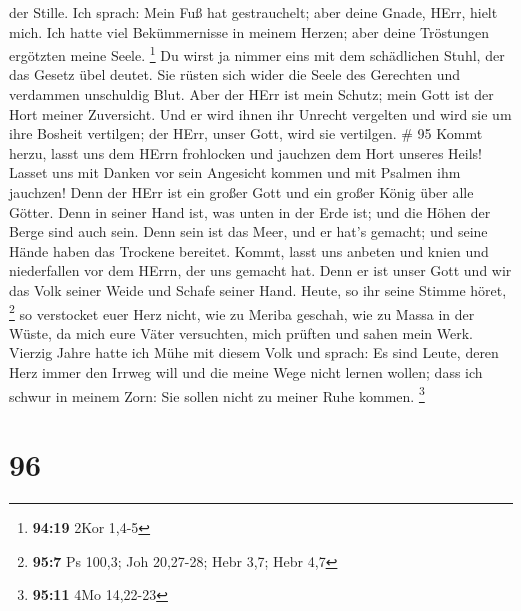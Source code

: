 der Stille.  Ich sprach: Mein Fuß hat gestrauchelt; aber
deine Gnade, HErr, hielt mich.  Ich hatte viel
Bekümmernisse in meinem Herzen; aber deine Tröstungen ergötzten meine
Seele. \footnote{\textbf{94:19} 2Kor 1,4-5}  Du wirst ja
nimmer eins mit dem schädlichen Stuhl, der das Gesetz übel deutet.
 Sie rüsten sich wider die Seele des Gerechten und
verdammen unschuldig Blut.  Aber der HErr ist mein Schutz;
mein Gott ist der Hort meiner Zuversicht.  Und er wird
ihnen ihr Unrecht vergelten und wird sie um ihre Bosheit vertilgen; der
HErr, unser Gott, wird sie vertilgen. \# 95  Kommt herzu,
lasst uns dem HErrn frohlocken und jauchzen dem Hort unseres Heils!
 Lasset uns mit Danken vor sein Angesicht kommen und mit
Psalmen ihm jauchzen!  Denn der HErr ist ein großer Gott und
ein großer König über alle Götter.  Denn in seiner Hand ist,
was unten in der Erde ist; und die Höhen der Berge sind auch sein.
 Denn sein ist das Meer, und er hat's gemacht; und seine
Hände haben das Trockene bereitet.  Kommt, lasst uns anbeten
und knien und niederfallen vor dem HErrn, der uns gemacht hat.
 Denn er ist unser Gott und wir das Volk seiner Weide und
Schafe seiner Hand. Heute, so ihr seine Stimme höret, \footnote{\textbf{95:7}
  Ps 100,3; Joh 20,27-28; Hebr 3,7; Hebr 4,7}  so verstocket
euer Herz nicht, wie zu Meriba geschah, wie zu Massa in der Wüste,
 da mich eure Väter versuchten, mich prüften und sahen mein
Werk.  Vierzig Jahre hatte ich Mühe mit diesem Volk und
sprach: Es sind Leute, deren Herz immer den Irrweg will und die meine
Wege nicht lernen wollen;  dass ich schwur in meinem Zorn:
Sie sollen nicht zu meiner Ruhe kommen. \footnote{\textbf{95:11} 4Mo
  14,22-23}

\hypertarget{section-31}{%
\section{96}\label{section-31}}

